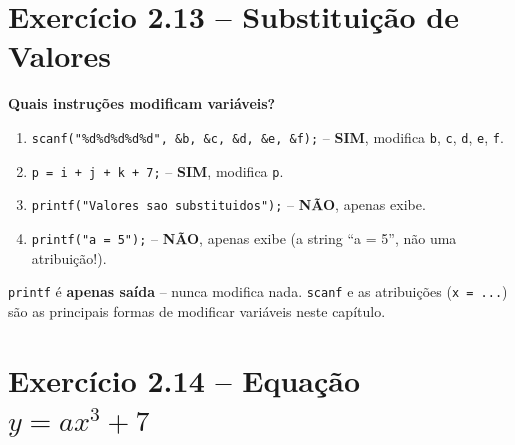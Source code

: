 \documentclass[12pt,a4paper]{article}
\begin{document}
\section{Exercício 2.13 -- Substituição de Valores}

\begin{respostabox}
\textbf{Quais instruções modificam variáveis?}

\begin{enumerate}[label=\textbf{\alph*)}]
\item \texttt{scanf("\%d\%d\%d\%d\%d", \&b, \&c, \&d, \&e, \&f);} -- \textbf{SIM},
modifica \texttt{b}, \texttt{c}, \texttt{d}, \texttt{e}, \texttt{f}.

\item \texttt{p = i + j + k + 7;} -- \textbf{SIM}, modifica \texttt{p}.

\item \texttt{printf("Valores sao substituidos");} -- \textbf{NÃO}, apenas exibe.

\item \texttt{printf("a = 5");} -- \textbf{NÃO}, apenas exibe (a string ``a = 5'',
não uma atribuição!).
\end{enumerate}

\begin{boaprática}
  \texttt{printf} é \textbf{apenas saída} -- nunca modifica nada. \texttt{scanf}
  e as atribuições (\texttt{x = ...}) são as principais formas de modificar
  variáveis neste capítulo.
\end{boaprática}
\end{respostabox}

\section{Exercício 2.14 -- Equação $y = ax^3 + 7$}
\end{document}
